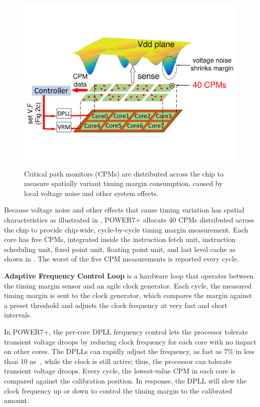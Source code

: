 \begin{figure}[t]
\centering
   \includegraphics[trim=0 250 0 260,clip,width=.8\linewidth]{graphs/voltage/control-loop.pdf}
  \caption{Critical path monitors (CPMs) are distributed across the chip to measure spatially variant timing margin consumption, caused by local voltage noise and other system effects.}
\label{fig:spatial-noise} 
\end{figure}

Because voltage noise and other effects that cause timing variation has spatial characteristics as illustrated in , POWER7+ allocate 40 CPMs distributed across the chip to provide chip-wide, cycle-by-cycle timing margin measurement. Each core has five CPMs, integrated inside the instruction fetch unit, instruction scheduling unit, fixed point unit, floating point unit, and last level cache as shown in . The worst of the five CPM measurements is reported every cycle.

\textbf{Adaptive Frequency Control Loop} is a hardware loop that operates between the timing margin sensor and an agile clock generator. Each cycle, the measured timing margin is sent to the clock generator, which compares the margin against a preset threshold and adjusts the clock frequency at very fast and short intervals.

In POWER7+, the per-core DPLL frequency control lets the processor tolerate transient voltage droops by reducing clock frequency for each core with no impact on other cores. The DPLLs can rapidly adjust the frequency, as fast as 7\% in less than 10 ns~\cite{vezyrtzis2018droop}, while the clock is still active; thus, the processor can tolerate transient voltage droops. Every cycle, the lowest-value CPM in each core is compared against the calibration position. In response, the DPLL will slew the clock frequency up or down to control the timing margin to the calibrated amount. 

